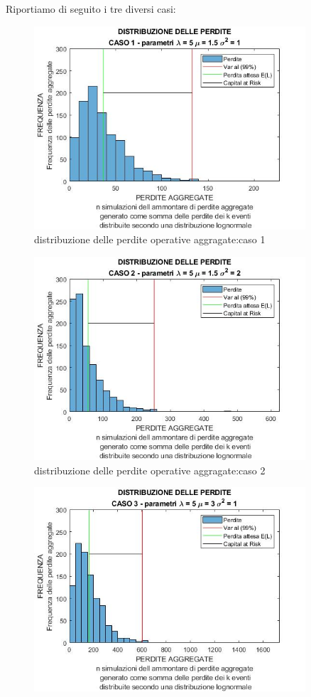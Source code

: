 \documentclass[titlepage]{article}
\begin{document}
\begin{itemize}
{Riportiamo di seguito i tre diversi casi:
\begin{figure}[htbp]
	\centering
	\includegraphics[width=0.9\textwidth]{LOSS1.jpg}
	\caption{\label{fig:losss.png}distribuzione delle perdite operative aggragate:caso 1}
\end{figure}
\begin{figure}[htbp]
	\centering
	\includegraphics[width=0.9\textwidth]{LOSS2.jpg}
	\caption{\label{fig:losss.png}distribuzione delle perdite operative aggragate:caso 2}
\end{figure}
\begin{figure}[htbp]
	\centering
	\includegraphics[width=0.9\textwidth]{LOSS3.jpg}

\end{figure}}
\end{itemize}
\end{document}
